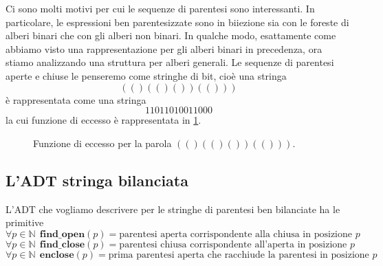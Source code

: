 Ci sono molti motivi per cui le sequenze di parentesi sono interessanti. In particolare,
le espressioni ben parentesizzate sono in biiezione sia con le foreste di alberi binari che con gli
alberi non binari. In qualche modo, esattamente come abbiamo visto una rappresentazione
per gli alberi binari in precedenza, ora stiamo analizzando una struttura per alberi
generali. Le sequenze di parentesi aperte e chiuse le penseremo come stringhe di bit, cioè
una stringa
$$
	(()(()())(()))
$$
è rappresentata come una stringa
$$
	11011010011000
$$
la cui funzione di eccesso è rappresentata in \cref{fig:func_excess_example}.

\begin{figure}[h]
	\centering
	\caption{Funzione di eccesso per la parola $(()(()())(()))$.}
	\label{fig:func_excess_example}
\end{figure}

\subsection{L'ADT stringa bilanciata}
L'ADT che vogliamo descrivere per le stringhe di parentesi ben bilanciate ha le primitive
$$
	\forall p \in \mathbb{N} ~~ \mathbf{find\_open}(p) = \text{parentesi aperta corrispondente alla chiusa in posizione } p
$$
$$
	\forall p \in \mathbb{N} ~~ \mathbf{find\_close}(p) = \text{parentesi chiusa corrispondente all'aperta in posizione } p
$$
$$
	\forall p \in \mathbb{N} ~~ \mathbf{enclose}(p) = \text{prima parentesi aperta che racchiude la parentesi in posizione } p
$$

